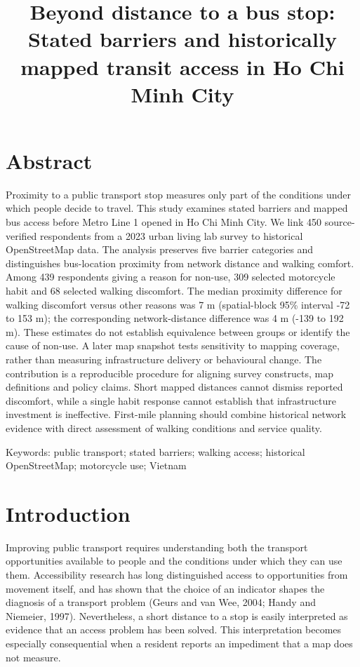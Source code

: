 \documentclass[
  11pt,
  a4paper,
]{article}
\title{Beyond distance to a bus stop: Stated barriers and historically
mapped transit access in Ho Chi Minh City}
\author{}
\date{}
\begin{document}
\maketitle

\section*{Abstract}\label{abstract}

Proximity to a public transport stop measures only part of the
conditions under which people decide to travel. This study examines
stated barriers and mapped bus access before Metro Line 1 opened in Ho
Chi Minh City. We link 450 source-verified respondents from a 2023 urban
living lab survey to historical OpenStreetMap data. The analysis
preserves five barrier categories and distinguishes bus-location
proximity from network distance and walking comfort. Among 439
respondents giving a reason for non-use, 309 selected motorcycle habit
and 68 selected walking discomfort. The median proximity difference for
walking discomfort versus other reasons was 7 m (spatial-block 95\%
interval -72 to 153 m); the corresponding network-distance difference
was 4 m (-139 to 192 m). These estimates do not establish equivalence
between groups or identify the cause of non-use. A later map snapshot
tests sensitivity to mapping coverage, rather than measuring
infrastructure delivery or behavioural change. The contribution is a
reproducible procedure for aligning survey constructs, map definitions
and policy claims. Short mapped distances cannot dismiss reported
discomfort, while a single habit response cannot establish that
infrastructure investment is ineffective. First-mile planning should
combine historical network evidence with direct assessment of walking
conditions and service quality.

Keywords: public transport; stated barriers; walking access; historical
OpenStreetMap; motorcycle use; Vietnam

\section{Introduction}\label{introduction}

Improving public transport requires understanding both the transport
opportunities available to people and the conditions under which they
can use them. Accessibility research has long distinguished access to
opportunities from movement itself, and has shown that the choice of an
indicator shapes the diagnosis of a transport problem (Geurs and van
Wee, 2004; Handy and Niemeier, 1997). Nevertheless, a short distance to
a stop is easily interpreted as evidence that an access problem has been
solved. This interpretation becomes especially consequential when a
resident reports an impediment that a map does not measure.
\end{document}
